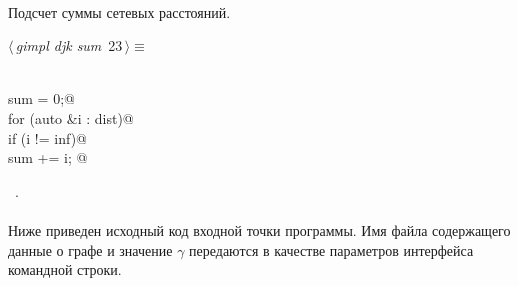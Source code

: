 \documentclass[12pt]{article}
\begin{document}
\paragraph{}
Подсчет суммы сетевых расстояний.
\begin{flushleft} \small
\begin{minipage}{\linewidth}\label{scrap41}\raggedright\small
{} $\langle\,${\itshape gimpl djk sum}\nobreak\ {\footnotesize {23}}$\,\rangle\equiv$
\vspace{-1ex}
\begin{list}{}{} \item
\mbox{}\verb@@\\
\mbox{}\verb@double sum = 0;@\\
\mbox{}\verb@    for (auto &i : dist)@\\
\mbox{}\verb@        if (i != inf)@\\
\mbox{}\verb@            sum += i; @\\
\mbox{}\verb@@{\NWsep}
\end{list}
\vspace{-1.5ex}
\footnotesize
\begin{list}{}{\setlength{\itemsep}{-\parsep}\setlength{\itemindent}{-\leftmargin}}
\item \NWtxtMacroRefIn\ .

\item{}
\end{list}
\end{minipage}\vspace{4ex}
\end{flushleft}
\paragraph{}
Ниже приведен исходный код входной точки программы. 
Имя файла содержащего данные о графе и значение 
$\gamma$ передаются в качестве параметров интерфейса командной строки.
\end{document}
